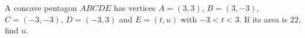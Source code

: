 A concave pentagon $ABCDE$ has vertices $A=(3,3)$, $B=(3,-3)$, $C=(-3,-3)$, $D=(-3,3)$ and $E=(t,u)$ with $-3<t<3$. If its area is $22$, find $u$.
